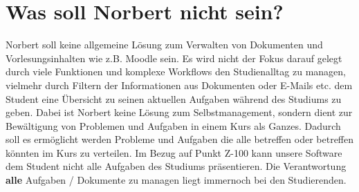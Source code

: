 \section{Was soll Norbert nicht sein?}

Norbert soll keine allgemeine Lösung zum Verwalten von Dokumenten und Vorlesungsinhalten wie z.B. Moodle sein.
Es wird nicht der Fokus darauf gelegt durch viele Funktionen und komplexe Workflows den Studienalltag zu managen,
vielmehr durch Filtern der Informationen aus Dokumenten oder E-Mails etc. dem Student eine Übersicht zu seinen aktuellen Aufgaben während des Studiums zu geben.
Dabei ist Norbert keine Lösung zum Selbstmanagement, sondern dient zur Bewältigung von Problemen und Aufgaben in einem Kurs als Ganzes. 
Dadurch soll es ermöglicht werden Probleme und Aufgaben die alle betreffen oder betreffen könnten im Kurs zu verteilen.
Im Bezug auf Punkt Z-100 kann unsere Software dem Student nicht alle Aufgaben des Studiums präsentieren. Die Verantwortung \textbf{alle} Aufgaben / Dokumente zu managen liegt immernoch bei den Studierenden. 
